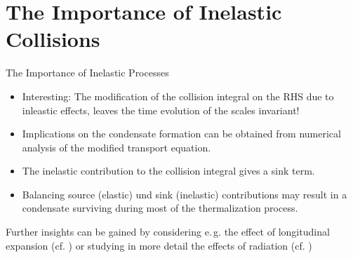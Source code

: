 \section{The Importance of Inelastic Collisions}

\begin{frame}{The Importance of Inelastic Processes}
\begin{itemize}
	\item \alert{Interesting:} The modification of the collision integral on the RHS due to inleastic effects, leaves the \alert{time evolution of the scales invariant}!
	\item Implications on the \alert{condensate formation} can be obtained from numerical analysis of the modified transport equation.
	\item The inelastic contribution to the collision integral gives a \alert{sink term}.
	\item Balancing source (elastic) und sink (inelastic) contributions may result in a condensate surviving during most of the thermalization process.
\end{itemize}
\vspace{0.5em}
Further insights can be gained by considering e.\,g. the effect of \alert{longitudinal expansion} (cf. \cite{Blaizot2012}) or studying in more detail the effects of \alert{radiation} (cf. \cite{Blaizot2016})
\end{frame}

